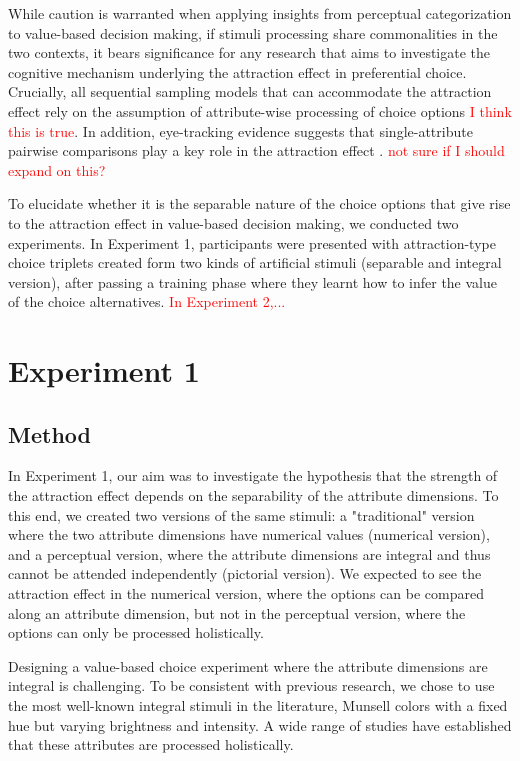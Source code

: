 \documentclass[11pt,a4paper]{article}
\begin{document}
While caution is warranted when applying insights from perceptual categorization to value-based decision making, if stimuli processing share commonalities in the two contexts, it bears significance for any research that aims to investigate the cognitive mechanism underlying the attraction effect in preferential choice.   Crucially, all sequential sampling models that can accommodate the attraction effect rely on the assumption of attribute-wise processing of choice options \textcolor{red}{I think this is true}. In addition, eye-tracking evidence suggests that single-attribute pairwise comparisons play a key role in the attraction effect \cite{Noguchi2014}. \textcolor{red}{not sure if I should expand on this?}

To elucidate whether it is the separable nature of the choice options that give rise to the attraction effect in value-based decision making, we conducted two experiments. In Experiment 1, participants were presented with attraction-type choice triplets created form two kinds of artificial stimuli (separable and integral version), after passing a training phase where they learnt how to infer the value of the choice alternatives. \textcolor{red}{In Experiment 2,...}

\section{Experiment 1} 


\subsection{Method}

In Experiment 1, our aim was to investigate the hypothesis that the strength of the attraction effect depends on the separability of the attribute dimensions. To this end, we created two versions of the same stimuli: a "traditional" version where the two attribute dimensions have numerical values (numerical version), and a perceptual version, where the attribute dimensions are integral and thus cannot be attended independently (pictorial version). We expected to see the attraction effect in the numerical version, where the options can be compared along an attribute dimension, but not in the perceptual version, where the options can only be processed holistically.

Designing a value-based choice experiment where the attribute dimensions are integral is challenging. To be consistent with previous research, we chose to use the most well-known integral stimuli in the literature, Munsell colors with a fixed hue but varying brightness and intensity. A wide range of studies have established that these attributes are processed holistically. 
\end{document}
